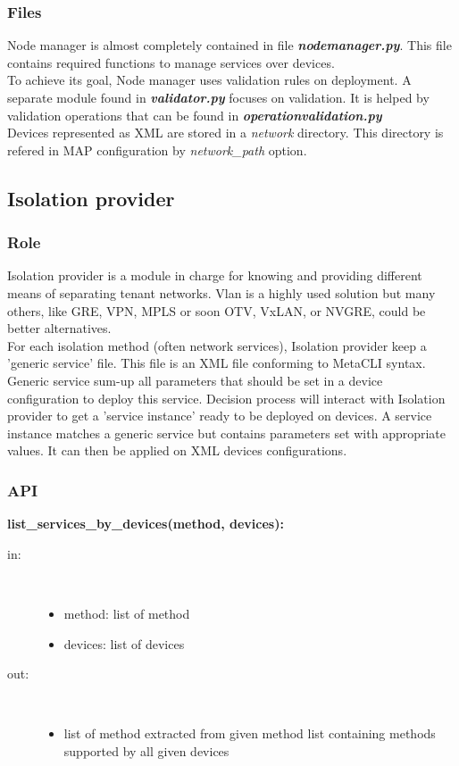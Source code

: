 \subsubsection{Files}
Node manager is almost completely contained in file \emph{\textbf{nodemanager.py}}. This file contains required functions to manage services over devices.\\
To achieve its goal, Node manager uses validation rules on deployment. A separate module found in \emph{\textbf{validator.py}} focuses on validation. It is helped by validation operations that can be found in \emph{\textbf{operationvalidation.py}}\\
Devices represented as XML are stored in a \emph{network} directory. This directory is refered in MAP configuration by \emph{network\_path} option.


\subsection{Isolation provider}
\subsubsection{Role}
Isolation provider is a module in charge for knowing and providing different means of separating tenant networks. Vlan is a highly used solution but many others, like GRE, VPN, MPLS or soon OTV, VxLAN, or NVGRE, could be better alternatives.\\
For each isolation method (often network services), Isolation provider keep a 'generic service' file. This file is an XML file conforming to MetaCLI syntax. Generic service sum-up all parameters that should be set in a device configuration to deploy this service. Decision process will interact with Isolation provider to get a 'service instance' ready to be deployed on devices. A service instance matches a generic service but contains parameters set with appropriate values. It can then be applied on XML devices configurations.

\subsubsection{API}
\textbf{list\_services\_by\_devices(method, devices):}
\begin{description}
    \item[in:] \hfill \\
        \begin{itemize}
            \item method: list of method
            \item devices: list of devices
        \end{itemize}
    \item[out:] \hfill \\
        \begin{itemize}
            \item list of method extracted from given method list containing methods supported by all given devices
        \end{itemize}
\end{description}

